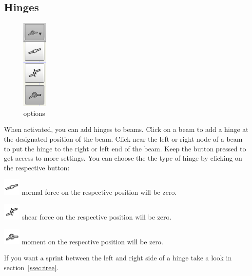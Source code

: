 \documentclass[a4paper,11pt]{report}
\begin{document}
\subsection{Hinges}

\begin{minipage}[h]{4cm}
\begin{figure}[H]
\begin{center}
\includegraphics[scale=0.6]{./pictures/hinge_opt.png}
\caption{options}
\label{pic:hinge_opt}
\end{center}
\end{figure}
\end{minipage}
\begin{minipage}[h]{\textwidth-4cm}
When activated, you can add hinges to beams. Click on a beam to add a hinge at the designated position of the beam. Click near the left or right node of a beam to put the hinge to the right or left end of the beam. Keep the button pressed to get access to more settings. You can choose the the type of hinge by clicking on the respective button:
\begin{trivlist}
	\item[] \includegraphics[scale = 0.5]{../../icons/jointN.png} normal force on the respective position will be zero.
	\item[] \includegraphics[scale = 0.5]{../../icons/jointQ.png} shear force on the respective position will be zero.
	\item[] \includegraphics[scale = 0.5]{../../icons/joint.png} moment on the respective position will be zero.
\end{trivlist}
If you want a sprint between the left and right side of a hinge take a look in section~\ref{ssec:tree}.
\end{minipage}
\end{document}
